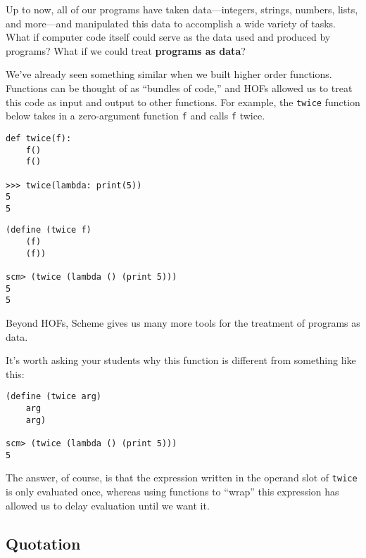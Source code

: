 Up to now, all of our programs have taken data---integers, strings, numbers, lists, and more---and manipulated this data to accomplish a wide variety of tasks. What if computer code itself could serve as the data used and produced by programs? What if we could treat \textbf{programs as data}?

We've already seen something similar when we built higher order functions. Functions can be thought of as ``bundles of code,'' and HOFs allowed us to treat this code as input and output to other functions. For example, the \lstinline{twice} function below takes in a zero-argument function \lstinline{f} and calls \lstinline{f} twice. 

\begin{minipage}[t]{0.4\textwidth}
\lstset{language=Python}
\begin{lstlisting}
def twice(f):
    f()
    f()

>>> twice(lambda: print(5))
5
5
\end{lstlisting}
\end{minipage}
\begin{minipage}[t]{0.6\textwidth}
\lstset{language=Scheme}
\begin{lstlisting}
(define (twice f)
    (f)
    (f))

scm> (twice (lambda () (print 5)))
5
5
\end{lstlisting}
\end{minipage}

Beyond HOFs, Scheme gives us many more tools for the treatment of programs as data. 

\begin{meta}
It's worth asking your students why this function is different from something like this: 

\begin{lstlisting}
(define (twice arg)
    arg
    arg)

scm> (twice (lambda () (print 5)))
5
\end{lstlisting}

The answer, of course, is that the expression written in the operand slot of \lstinline{twice} is only evaluated once, whereas using functions to ``wrap'' this expression has allowed us to delay evaluation until we want it. 
\end{meta}

\subsection{Quotation}

